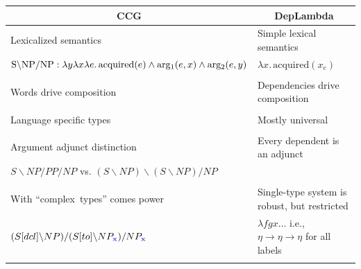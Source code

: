 \documentclass[mathserif,12pt]{beamer}
\newcommand{\hlight}[1]{{\color{blue!80} #1}}
\newcommand{\lx}{\lambda x }
\renewcommand{\land}{\wedge}
\newcommand{\lspace}{.\,}
\begin{document}
\begin{frame}
\vspace{-0.5em}
\begin{center}
\begin{tabular}{p{5.6cm}|p{5.6cm}}
 \multicolumn{1}{c|}{\hlight{CCG}} & \multicolumn{1}{c}{\hlight{DepLambda}} \\
 \midrule
 Lexicalized semantics & Simple lexical semantics \\
 \scriptsize $\hbox{S} \backslash \hbox{NP}/ \hbox{NP} : \lambda y \lambda x \lambda e \lspace \mathrm{acquired}(e) \land \mathrm{arg_1}(e, x) \land \mathrm{arg_2}(e, y)$  & \scriptsize $\lx \lspace \mathrm{acquired}(x_e)$ \\ 
\\
 Words drive composition & Dependencies drive composition \\
\\
 Language specific types & Mostly universal \\
\\
 
Argument adjunct distinction  & Every dependent is an adjunct \\
 \scriptsize $S\backslash NP/PP/NP$ vs. $(S\backslash NP)\backslash(S\backslash NP)/NP$ & \\
\visible<2->{\\
With ``complex~types'' comes power & Single-type system is robust, but restricted \\
\scriptsize $(S[dcl]\backslash NP)/(S[to]\backslash NP_{\hlight{\bf x}})/NP_{\hlight{\bf x}}$ & \small $\lambda fgx \ldots $ i.e., $\eta \rightarrow \eta \rightarrow \eta$ for all labels \\}
\end{tabular}
\end{center}
\end{frame}
\end{document}
